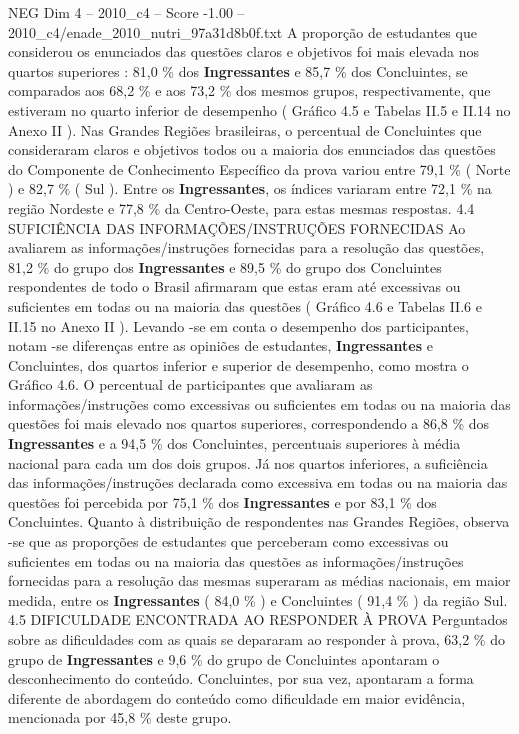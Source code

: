 \begin{textsample}{NEG Dim 4 – 2010\_c4 – Score -1.00 – 2010\_c4/enade\_2010\_nutri\_97a31d8b0f.txt}
A proporção de estudantes que considerou os enunciados das questões claros e objetivos foi mais elevada nos quartos superiores : 81,0 \% dos \textbf{Ingressantes} e 85,7 \% dos Concluintes, se comparados aos 68,2 \% e aos 73,2 \% dos mesmos grupos, respectivamente, que estiveram no quarto inferior de desempenho ( Gráfico 4.5 e Tabelas II.5 e II.14 no Anexo II ).
Nas Grandes Regiões brasileiras, o percentual de Concluintes que consideraram claros e objetivos todos ou a maioria dos enunciados das questões do Componente de Conhecimento Específico da prova variou entre 79,1 \% ( Norte ) e 82,7 \% ( Sul ).
Entre os \textbf{Ingressantes}, os índices variaram entre 72,1 \% na região Nordeste e 77,8 \% da Centro-Oeste, para estas mesmas respostas. 4.4 SUFICIÊNCIA DAS INFORMAÇÕES/INSTRUÇÕES FORNECIDAS Ao avaliarem as informações/instruções fornecidas para a resolução das questões, 81,2 \% do grupo dos \textbf{Ingressantes} e 89,5 \% do grupo dos Concluintes respondentes de todo o Brasil afirmaram que estas eram até excessivas ou suficientes em todas ou na maioria das questões ( Gráfico 4.6 e Tabelas II.6 e II.15 no Anexo II ).
Levando -se em conta o desempenho dos participantes, notam -se diferenças entre as opiniões de estudantes, \textbf{Ingressantes} e Concluintes, dos quartos inferior e superior de desempenho, como mostra o Gráfico 4.6.
O percentual de participantes que avaliaram as informações/instruções como excessivas ou suficientes em todas ou na maioria das questões foi mais elevado nos quartos superiores, correspondendo a 86,8 \% dos \textbf{Ingressantes} e a 94,5 \% dos Concluintes, percentuais superiores à média nacional para cada um dos dois grupos.
Já nos quartos inferiores, a suficiência das informações/instruções declarada como excessiva em todas ou na maioria das questões foi percebida por 75,1 \% dos \textbf{Ingressantes} e por 83,1 \% dos Concluintes.
Quanto à distribuição de respondentes nas Grandes Regiões, observa -se que as proporções de estudantes que perceberam como excessivas ou suficientes em todas ou na maioria das questões as informações/instruções fornecidas para a resolução das mesmas superaram as médias nacionais, em maior medida, entre os \textbf{Ingressantes} ( 84,0 \% ) e Concluintes ( 91,4 \% ) da região Sul. 4.5 DIFICULDADE ENCONTRADA AO RESPONDER À PROVA Perguntados sobre as dificuldades com as quais se depararam ao responder à prova, 63,2 \% do grupo de \textbf{Ingressantes} e 9,6 \% do grupo de Concluintes apontaram o desconhecimento do conteúdo.
Concluintes, por sua vez, apontaram a forma diferente de abordagem do conteúdo como dificuldade em maior evidência, mencionada por 45,8 \% deste grupo.

\end{textsample}
